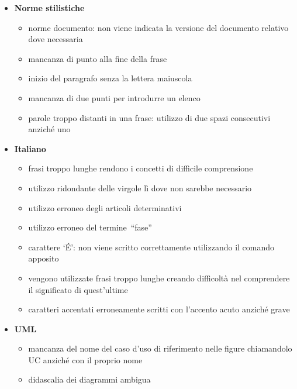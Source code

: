 \begin{itemize}

\item \textbf{Norme stilistiche}

	\begin{itemize}
	
	\item norme documento: non viene indicata la versione del documento relativo dove  necessaria
	\item mancanza di punto alla fine della frase
	\item inizio del paragrafo senza la lettera maiuscola
	\item mancanza di due punti per introdurre un elenco
	\item parole troppo distanti in una frase: utilizzo di due spazi consecutivi anziché uno
	
	\end{itemize}


\item \textbf{Italiano}

	\begin{itemize}

	\item frasi troppo lunghe rendono i concetti di difficile comprensione 
	\item utilizzo ridondante delle virgole lì dove non sarebbe necessario
	\item utilizzo erroneo degli articoli determinativi
	\item utilizzo erroneo del termine “fase”
	\item carattere ‘\'E’: non viene scritto correttamente utilizzando il comando apposito
	\item vengono utilizzate frasi troppo lunghe creando difficoltà nel comprendere il significato di quest’ultime
	\item caratteri accentati erroneamente scritti con l'accento acuto anziché grave
	
	\end{itemize}


\item \textbf{UML}


	\begin{itemize}
	\item mancanza del nome del caso d'uso di riferimento nelle figure chiamandolo UC anziché con il proprio nome
	\item didascalia dei diagrammi ambigua
	\end{itemize}




\end{itemize}

